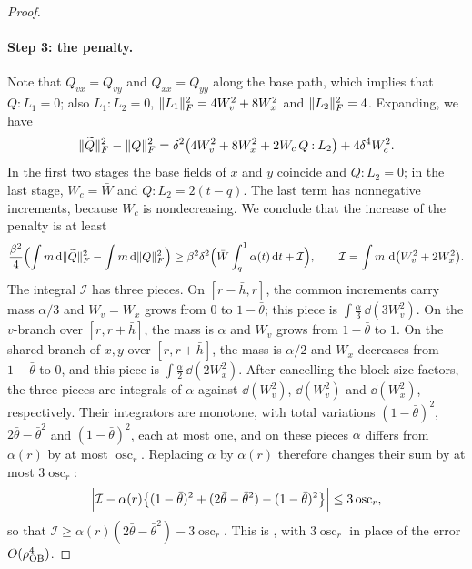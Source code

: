 \begin{proof}
\paragraph{Step 3: the penalty.} Note that $Q_{vx}=Q_{vy}$ and $Q_{xx}=Q_{yy}$ along the base path, which implies that $Q\mathbin{:}L_1=0$; also $L_1\mathbin{:}L_2=0$, $\lVert L_1\rVert_F^2=4W_v^2+8W_x^2$ and $\lVert L_2\rVert_F^2=4$. Expanding, we have
\[
 \lVert \widetilde Q\rVert_F^2-\lVert Q\rVert_F^2=\delta^2\bigl(4W_v^2+8W_x^2+2W_c\,Q\mathbin{:}L_2\bigr)+4\delta^4W_c^2.
\]
In the first two stages the base fields of $x$ and $y$ coincide and $Q\mathbin{:}L_2=0$; in the last stage, $W_c=\bar W$ and $Q\mathbin{:}L_2=2(t-q)$. The last term has nonnegative increments, because $W_c$ is nondecreasing. We conclude that the increase of the penalty is at least
\begin{equation}\label{eq:st-penalty}
 \frac{\beta^2}4\Bigl(\int m\,\mathrm d\lVert \widetilde Q\rVert_F^2-\int m\,\mathrm d\lVert Q\rVert_F^2\Bigr)\ge\beta^2\delta^2\Bigl(\bar W\int_q^1\alpha(t)\,\mathrm d t+\mathcal I\Bigr),\qquad
 \mathcal I=\int m\,\,\mathrm d\bigl(W_v^2+2W_x^2\bigr).
\end{equation}
The integral $\mathcal I$ has three pieces. On $[r-\bar h,r]$, the common increments carry mass $\alpha/3$ and $W_v=W_x$ grows from $0$ to $1-\bar\theta$; this piece is $\int\frac\alpha3\,\dd(3W_v^2)$. On the $v$-branch over $[r,r+\bar h]$, the mass is $\alpha$ and $W_v$ grows from $1-\bar\theta$ to $1$. On the shared branch of $x,y$ over $[r,r+\bar h]$, the mass is $\alpha/2$ and $W_x$ decreases from $1-\bar\theta$ to $0$, and this piece is $\int\frac\alpha2\,\dd(2W_x^2)$. After cancelling the block-size factors, the three pieces are integrals of $\alpha$ against $\dd(W_v^2)$, $\dd(W_v^2)$ and $\dd(W_x^2)$, respectively. Their integrators are monotone, with total variations $(1-\bar\theta)^2$, $2\bar\theta-\bar\theta^2$ and $(1-\bar\theta)^2$, each at most one, and on these pieces $\alpha$ differs from $\alpha(r)$ by at most $\operatorname{osc}_r$. Replacing $\alpha$ by $\alpha(r)$ therefore changes their sum by at most $3\operatorname{osc}_r$:
\[
 \Bigl|\mathcal I-\alpha(r)\bigl\{(1-\bar\theta)^2+(2\bar\theta-\bar\theta^2)-(1-\bar\theta)^2\bigr\}\Bigr|\le3\operatorname{osc}_r,
\]
so that $\mathcal I\ge\alpha(r)(2\bar\theta-\bar\theta^2)-3\operatorname{osc}_r$.
This is \cite[(7.14)--(7.15)]{oai-barriers}, with $3\operatorname{osc}_r$ in place of the error $O(\rho_{\rm OB}^4)$.


\end{proof}
